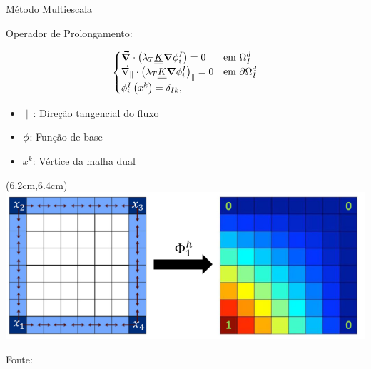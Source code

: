 \documentclass[professionalfont]{beamer}
\begin{document}

\begin{frame}{Método Multiescala}
    \justify
    
    \small 
    Operador de Prolongamento:

    \begin{equation}
        \label{eq:multiescala.1}
        \begin{cases}
            \mbox{\boldmath$ \vec{\nabla} $} \cdot \left( \lambda_{T} \underline{\underline{K}} \mbox{\boldmath$ \nabla $} \phi^{I}_{i} \right) = 0 & \text{em } \Omega_{I}^{d}\\
            \vec{\nabla}_{\parallel} \cdot \left( \lambda_{T} \underline{\underline{K}} \mbox{\boldmath$ \nabla $} \phi^{I}_{i} \right)_{\parallel} = 0 & \text{em } \partial \Omega_{I}^{d}\\
            \phi^{I}_{i} \left( x^{k}\right) = \delta_{Ik},
        \end{cases}
    \end{equation}


    \begin{itemize}
        \item $\parallel$: Direção tangencial do fluxo
        \item $\phi$: Função de base
        \item $x^{k}$: Vértice da malha dual
    \end{itemize}
    
    \begin{textblock*}{5cm}(6.2cm,6.4cm) %
        \centering
        \includegraphics[scale=0.25]{./imgs/op_example.png}
        
        {\small Fonte: \cite{Hajibeygi_2020}}
    \end{textblock*}

    
    
    

    

    
\end{frame}
\end{document}
